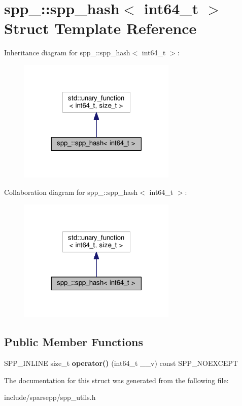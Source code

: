 \hypertarget{structspp___1_1spp__hash_3_01int64__t_01_4}{}\section{spp\+\_\+\+:\+:spp\+\_\+hash$<$ int64\+\_\+t $>$ Struct Template Reference}
\label{structspp___1_1spp__hash_3_01int64__t_01_4}


Inheritance diagram for spp\+\_\+\+:\+:spp\+\_\+hash$<$ int64\+\_\+t $>$\+:\nopagebreak
\begin{figure}[H]
\begin{center}
\leavevmode
\includegraphics[width=213pt]{structspp___1_1spp__hash_3_01int64__t_01_4__inherit__graph}
\end{center}
\end{figure}


Collaboration diagram for spp\+\_\+\+:\+:spp\+\_\+hash$<$ int64\+\_\+t $>$\+:\nopagebreak
\begin{figure}[H]
\begin{center}
\leavevmode
\includegraphics[width=213pt]{structspp___1_1spp__hash_3_01int64__t_01_4__coll__graph}
\end{center}
\end{figure}
\subsection*{Public Member Functions}
\begin{DoxyCompactItemize}
\item 
S\+P\+P\+\_\+\+I\+N\+L\+I\+NE size\+\_\+t {\bfseries operator()} (int64\+\_\+t \+\_\+\+\_\+v) const S\+P\+P\+\_\+\+N\+O\+E\+X\+C\+E\+PT\hypertarget{structspp___1_1spp__hash_3_01int64__t_01_4_adef03e702720d0ae6347dd8e9ce2a9e0}{}\label{structspp___1_1spp__hash_3_01int64__t_01_4_adef03e702720d0ae6347dd8e9ce2a9e0}

\end{DoxyCompactItemize}


The documentation for this struct was generated from the following file\+:\begin{DoxyCompactItemize}
\item 
include/sparsepp/spp\+\_\+utils.\+h\end{DoxyCompactItemize}
